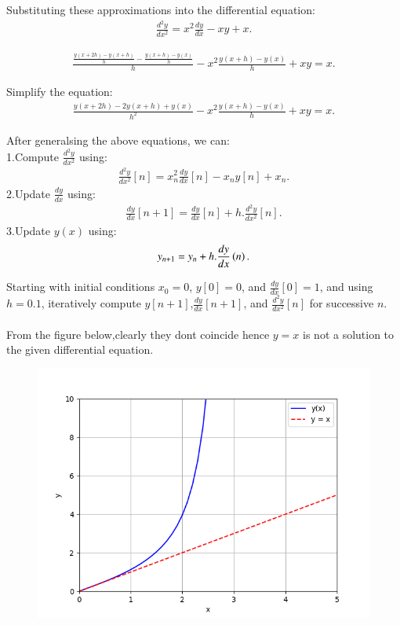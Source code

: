 \documentclass[journal]{IEEEtran}
\begin{document}
Substituting these approximations into the differential equation:
\begin{align}
\frac{d^2y}{dx^2} = x^2 \frac{dy}{dx} - xy + x.
\end{align}

\begin{align}
\frac{\frac{y(x+2h) - y(x+h)}{h} - \frac{y(x+h) - y(x)}{h}}{h} - x^2\frac{y(x+h) - y(x)}{h} + xy = x.
\end{align}

Simplify the equation:
\begin{align}
\frac{y(x+2h) - 2y(x+h) + y(x)}{h^2} - x^2\frac{y(x+h) - y(x)}{h} + xy = x.
\end{align}



After generalsing the above equations, we can:\\
1.Compute $\frac{d^2y}{dx^2}$ using:
   \begin{align}
   \frac{d^2y}{dx^2}[n] = x_n^2 \frac{dy}{dx}[n] - x_n y[n] + x_n.
   \end{align}
2.Update $\frac{dy}{dx}$ using:
   \begin{align}
   \frac{dy}{dx}[n+1] = \frac{dy}{dx}[n] + h.\frac{d^2y}{dx^2}[n].
   \end{align}
3.Update $y(x)$ using:
   \begin{align}
   y_{n+1} = y_n + h.\frac{dy}{dx}\left(n\right).
   \end{align}


Starting with initial conditions $x_0 = 0$, $y[0] = 0$, and $\frac{dy}{dx}[0] = 1$, and using $h = 0.1$, iteratively compute $y[n+1]$,$\frac{dy}{dx}[n+1]$, and $\frac{d^2y}{dx^2}[n]$ for successive $n$.\\
\\
From the figure below,clearly they dont coincide hence $y=x$ is not a solution to the given differential equation.


\begin{figure}[ht]
	\centering
	\includegraphics[width=1\textwidth]{figs/fig.png}
	\label{fig:Plot1}
\end{figure}
\end{document}
